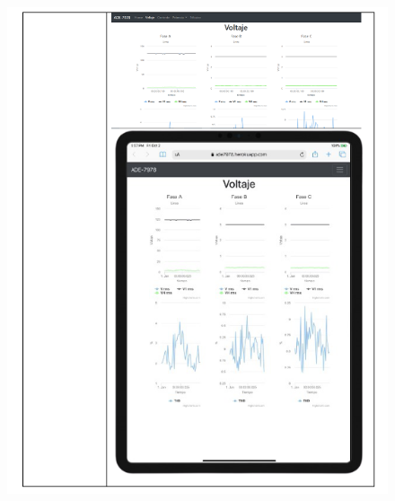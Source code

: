 \begin{appendix}
\begin{figure}[H]
    \includegraphics[width = 14cm]{Anexos/front-2.png}
    \label{fig:front2}
\end{figure}
\begin{figure}[H]
    \centering

\end{figure}
\end{appendix}
